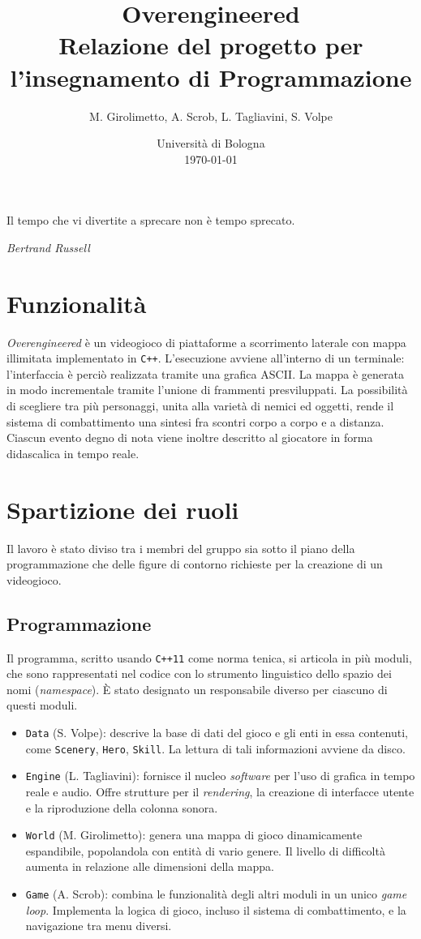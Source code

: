 \documentclass[a4paper]{article}
\title{Overengineered \\
\large Relazione del progetto per l'insegnamento di Programmazione}
\author{
  M. Girolimetto,
  A. Scrob,
  L. Tagliavini,
  S. Volpe
}
\date{
	Universit\`a di Bologna \\
  \today
}
\begin{document}
\maketitle

\epigraph{Il tempo che vi divertite a sprecare non è tempo sprecato.}
{\textit{Bertrand Russell}}

\section{Funzionalit\`a}

\emph{Overengineered} \`e un videogioco di piattaforme a scorrimento laterale con
mappa illimitata implementato in \verb!C++!. L'esecuzione avviene all'interno di
un terminale: l'interfaccia \`e perci\`o realizzata tramite una grafica ASCII.
La mappa \`e generata in modo incrementale tramite l'unione di frammenti
presviluppati. La possibilit\`a di scegliere tra pi\`u personaggi, unita alla
variet\`a di nemici ed oggetti, rende il sistema di combattimento una sintesi
fra scontri corpo a corpo e a distanza. Ciascun evento degno di nota viene
inoltre descritto al giocatore in forma didascalica in tempo reale.

\section{Spartizione dei ruoli}

Il lavoro \`e stato diviso tra i membri del gruppo sia sotto il piano della
programmazione che delle figure di contorno richieste per la creazione di un
videogioco.

\subsection{Programmazione}

Il programma, scritto usando \verb!C++11! come norma tenica, si articola in
pi\`u moduli, che sono rappresentati nel codice con lo strumento linguistico
dello spazio dei nomi (\emph{namespace}). \`E stato designato un responsabile
diverso per ciascuno di questi moduli.
\begin{itemize}
  \item \verb!Data! (S. Volpe): descrive la base di dati del gioco e gli enti in
    essa contenuti, come \verb!Scenery!, \verb!Hero!, \verb!Skill!. La lettura
    di tali informazioni avviene da disco.
  \item \verb!Engine! (L. Tagliavini): fornisce il nucleo \emph{software} per
    l'uso di grafica in tempo reale e audio. Offre strutture per il
    \emph{rendering}, la creazione di interfacce utente e la riproduzione della
    colonna sonora.
  \item \verb!World! (M. Girolimetto): genera una mappa di gioco dinamicamente
    espandibile, popolandola con entit\`a di vario genere. Il livello di
    difficolt\`a aumenta in relazione alle dimensioni della mappa.
  \item \verb!Game! (A. Scrob): combina le funzionalit\`a degli altri moduli in
    un unico \emph{game loop}. Implementa la logica di gioco, incluso il sistema
    di combattimento, e la navigazione tra menu diversi.
\end{itemize}
\end{document}
